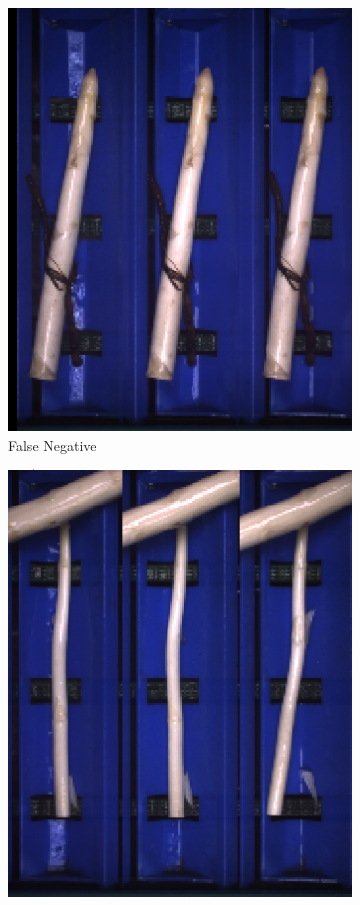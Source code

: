 \begin{figure}[h]
	\centering
	\begin{subfigure}{0.3\textwidth}
		\includegraphics[width=0.9\linewidth]{Figures/appendix/fractured_falsenegative_01.png}
		\vspace{-5pt}
		\caption{False Negative}
	\end{subfigure}
	\begin{subfigure}{0.3\textwidth}
		\includegraphics[width=0.9\linewidth]{Figures/appendix/fractured_falsenegative_02.png}

\end{subfigure}
\end{figure}
